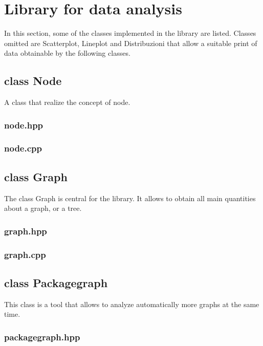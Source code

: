 \section{Library for data analysis}
\label{libra}
In this section, some of the classes implemented in the library are listed. Classes omitted are Scatterplot, Lineplot and Distribuzioni that allow a suitable print of data obtainable by the following classes.

\subsection{class Node}
A class that realize the concept of node.
\subsubsection{node.hpp}

\vspace{0.5cm}
\subsubsection{node.cpp}

\vspace{0.5cm}

\subsection{class Graph}
The class Graph is central for the library. It allows to obtain all main quantities about a graph, or a tree.
\subsubsection{graph.hpp}

\vspace{0.5cm}
\subsubsection{graph.cpp}

\vspace{0.5cm}

\subsection{class Packagegraph}
This class is a tool that allows to analyze automatically more graphs at the same time.
\subsubsection{packagegraph.hpp}

\vspace{0.5cm}
